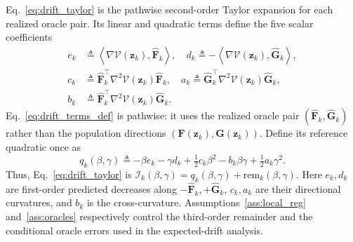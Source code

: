 \documentclass{article}
\theoremstyle{remark}
\newcommand{\inner}[2]{\left\langle #1,#2\right\rangle}
\newcommand{\bz}{\boldsymbol{z}}
\newcommand{\bF}{\boldsymbol{F}}
\newcommand{\bG}{\boldsymbol{G}}
\newcommand{\hatF}{\widehat{\boldsymbol{F}}}
\newcommand{\hatG}{\widehat{\boldsymbol{G}}}
\newcommand{\Vk}{\mathcal{V}}
\begin{document}
Eq.~\eqref{eq:drift_taylor} is the pathwise second-order Taylor expansion for each realized oracle pair.
Its linear and quadratic terms define the five scalar coefficients
\begin{equation}\label{eq:drift_terms_def}
\begin{aligned}
e_{k}&\triangleq\inner{\nabla\Vk(\bz_{k})}{\hatF_{k}},
\quad
d_{k}\triangleq -\inner{\nabla\Vk(\bz_{k})}{\hatG_{k}},\\
c_{k}&\triangleq\hatF_{k}^{\top}\nabla^{2}\Vk(\bz_{k})\hatF_{k},
\quad
a_{k}\triangleq\hatG_{k}^{\top}\nabla^{2}\Vk(\bz_{k})\hatG_{k},\\
b_{k}&\triangleq\hatF_{k}^{\top}\nabla^{2}\Vk(\bz_{k})\hatG_{k}.
\end{aligned}
\end{equation}
Eq.~\eqref{eq:drift_terms_def} is pathwise: it uses the realized oracle pair $(\hatF_k,\hatG_k)$ rather than the population directions $(\bF(\bz_k),\bG(\bz_k))$.
Define its reference quadratic once as
\begin{equation}\label{eq:qref}
q_k(\beta,\gamma)
\triangleq
-\beta e_k-\gamma d_k
+\tfrac12c_k\beta^2-b_k\beta\gamma
+\tfrac12a_k\gamma^2.
\end{equation}
Thus, Eq.~\eqref{eq:drift_taylor} is $\mathscr I_k(\beta,\gamma)=q_k(\beta,\gamma)+\mathrm{rem}_k(\beta,\gamma)$.
Here $e_k,d_k$ are first-order predicted decreases along $-\hatF_k,+\hatG_k$, $c_k,a_k$ are their directional curvatures, and $b_k$ is the cross-curvature.
Assumptions~\ref{ass:local_reg} and~\ref{ass:oracles} respectively control the third-order remainder and the conditional oracle errors used in the expected-drift analysis.
\end{document}
